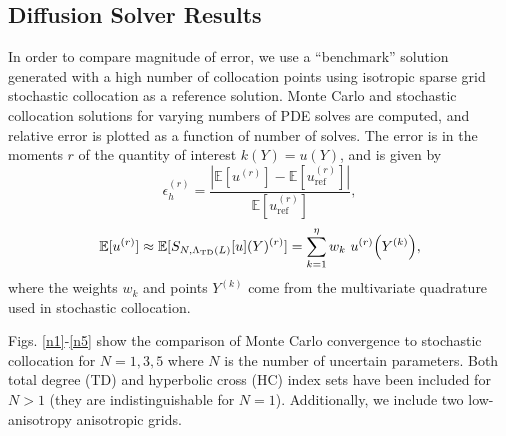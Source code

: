 \documentclass{mc2015}
\newcommand{\expv}[1]{\ensuremath{\mathbb{E}[ #1]}}
\begin{document}
\subsection{Diffusion Solver Results}
In order to compare magnitude of error, we use a ``benchmark'' solution generated with a high number of collocation points using isotropic sparse grid stochastic collocation as a reference solution.  Monte Carlo and stochastic collocation solutions for varying numbers of PDE solves are computed, and relative error is plotted as a function of number of solves.  The error is in the moments $r$ of the quantity of interest $k(Y)=u(Y)$, and is given by
\begin{equation}
\epsilon_h^{(r)}=\frac{|\expv{u^{(r)}}-\expv{u_\text{ref}^{(r)}}|}{\expv{u_\text{ref}^{(r)}}},
\end{equation}
\begin{equation}
\expv{u^{(r)}}\approx\expv{S_{N,\Lambda_\text{TD}(L)}[u](Y)^{(r)}}=\sum_{k=1}^\eta w_k ~u^{(r)}\qty(Y^{(k)}),
\end{equation}
where the weights $w_k$ and points $Y^{(k)}$ come from the multivariate quadrature used in stochastic collocation.

Figs. \ref{n1}-\ref{n5} show the comparison of Monte Carlo convergence to stochastic collocation for $N=1,3,5$ where $N$ is the number of uncertain parameters.  Both total degree (TD) and hyperbolic cross (HC) index sets have been included for $N>1$ (they are indistinguishable for $N=1$).  Additionally, we include two low-anisotropy anisotropic grids.
\end{document}
